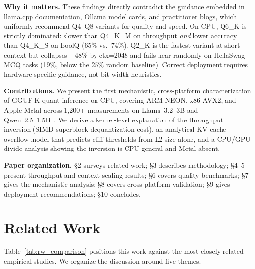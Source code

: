 \documentclass[conference]{IEEEtran}
\begin{document}
\textbf{Why it matters.}
These findings directly contradict the guidance embedded in llama.cpp
documentation, Ollama model cards, and practitioner blogs, which uniformly
recommend Q4--Q8 variants for quality and speed.
On CPU, Q6\_K is strictly dominated: slower than Q4\_K\_M on throughput
\emph{and} lower accuracy than Q4\_K\_S on BoolQ (65\% vs.\ 74\%).
Q2\_K is the fastest variant at short context but collapses $-48\%$ by
ctx=2048 and fails near-randomly on HellaSwag MCQ tasks (19\%,
below the 25\% random baseline).
Correct deployment requires hardware-specific guidance, not bit-width heuristics.

\textbf{Contributions.}
We present the first mechanistic, cross-platform characterization of GGUF
K-quant inference on CPU, covering ARM NEON, x86 AVX2, and Apple Metal across
1{,}200+ measurements on Llama~3.2~3B and Qwen~2.5~1.5B~\cite{qwen25}.
We derive a kernel-level explanation of the throughput inversion (SIMD
superblock dequantization cost), an analytical KV-cache overflow model that
predicts cliff thresholds from L2 size alone, and a CPU/GPU divide analysis
showing the inversion is CPU-general and Metal-absent.

\textbf{Paper organization.}
\S2 surveys related work; \S3 describes methodology; \S4--5 present
throughput and context-scaling results; \S6 covers quality benchmarks;
\S7 gives the mechanistic analysis; \S8 covers cross-platform validation;
\S9 gives deployment recommendations; \S10 concludes.

\section{Related Work}

Table~\ref{tab:rw_comparison} positions this work against the most closely related
empirical studies. We organize the discussion around five themes.
\end{document}
